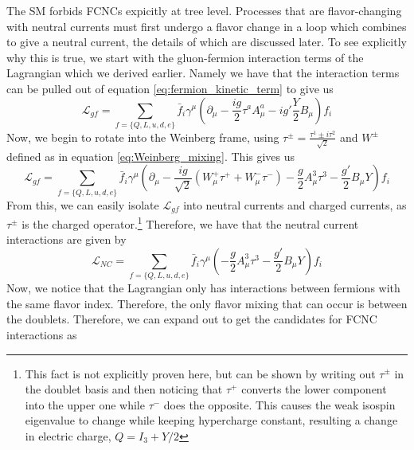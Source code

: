 The SM forbids FCNCs expicitly at tree level. Processes that are flavor-changing with neutral currents must first undergo a flavor change in a loop which combines to give a neutral current, the details of which are discussed later. To see explicitly why this is true, we start with the gluon-fermion interaction terms of the Lagrangian which we derived earlier. Namely we have that the interaction terms can be pulled out of equation \ref{eq:fermion_kinetic_term} to give us
\begin{equation}
\mathcal{L}_{gf} = \sum_{f=\{ Q, L, u, d, e\}} \bar{f}_{i} \gamma^\mu \left(\partial_\mu - \frac{ig}{2} \tau^a A^a_\mu - ig' \frac{Y}{2} B_\mu\right)f_{i}
\end{equation}
Now, we begin to rotate into the Weinberg frame, using $\tau^\pm = \frac{\tau^1 \pm i\tau^2}{\sqrt{2}}$ and $W^\pm$ defined as in equation \ref{eq:Weinberg_mixing}. This gives us
\begin{equation}
\mathcal{L}_{gf} = \sum_{f=\{ Q, L, u, d, e\}} \bar{f}_{i} \gamma^\mu \left(\partial_\mu - \frac{ig}{\sqrt{2}} (W^+_\mu\tau^+ + W_\mu^- \tau^-) -\frac{g}{2} A^3_\mu\tau^3 - \frac{g'}{2}B_\mu Y\right)f_{i}
\end{equation}
From this, we can easily isolate $\mathcal{L}_{gf}$ into neutral currents and charged currents, as $\tau^\pm$ is the charged operator.\footnote{This fact is not explicitly proven here, but can be shown by writing out $\tau^\pm$ in the doublet basis and then noticing that $\tau^+$ converts the lower component into the upper one while $\tau^-$ does the opposite. This causes the weak isospin eigenvalue to change while keeping hypercharge constant, resulting a change in electric charge, $Q = I_3 + Y/2$} Therefore, we have that the neutral current interactions are given by
\begin{equation}
\mathcal{L}_{NC} = \sum_{f=\{ Q, L, u, d, e\}} \bar{f}_{i} \gamma^\mu \left( -\frac{g}{2} A^3_\mu\tau^3 - \frac{g'}{2}B_\mu Y\right)f_{i}
\end{equation}
Now, we notice that the Lagrangian only has interactions between fermions with the same flavor index. Therefore, the only flavor mixing that can occur is between the doublets. Therefore, we can expand out to get the candidates for FCNC interactions as
